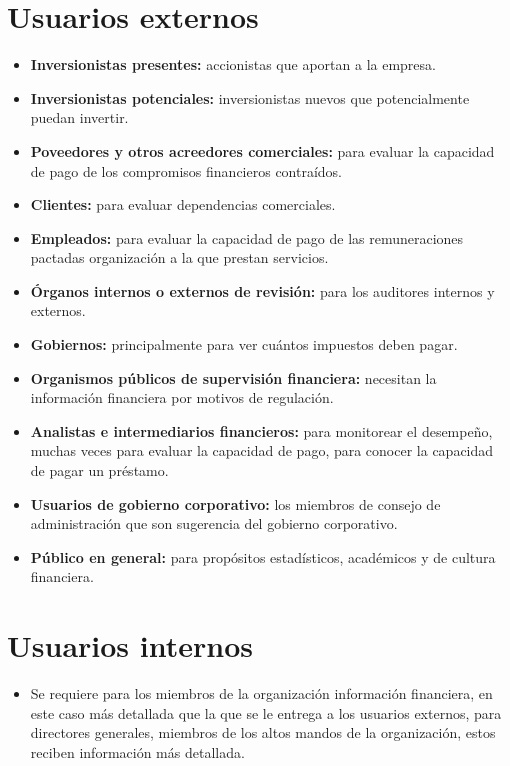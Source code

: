 \documentclass{article}
\begin{document}
\section{Usuarios externos}
\begin{itemize}
    \item \textbf{Inversionistas presentes:} accionistas que aportan a la empresa.
    \item \textbf{Inversionistas potenciales:} inversionistas nuevos que potencialmente puedan invertir.
    \item \textbf{Poveedores y otros acreedores comerciales:} para evaluar la capacidad de pago de los compromisos financieros contraídos.
    \item \textbf{Clientes:} para evaluar dependencias comerciales.
    \item \textbf{Empleados:} para evaluar la capacidad de pago de las remuneraciones pactadas organización a la que prestan servicios.
    \item \textbf{Órganos internos o externos de revisión:} para los auditores internos y externos.
    \item \textbf{Gobiernos:} principalmente para ver cuántos impuestos deben pagar.
    \item \textbf{Organismos públicos de supervisión financiera:} necesitan la información financiera por motivos de regulación.
    \item \textbf{Analistas e intermediarios financieros:} para monitorear el desempeño, muchas veces para evaluar la capacidad de pago, para conocer la capacidad de pagar un préstamo.
    \item \textbf{Usuarios de gobierno corporativo:} los miembros de consejo de administración que son sugerencia del gobierno corporativo.
    \item \textbf{Público en general:} para propósitos estadísticos, académicos y de cultura financiera.
\end{itemize}

\section{Usuarios internos}
\begin{itemize}
    \item Se requiere para los miembros de la organización información financiera, en este caso más detallada que la que se le entrega a los usuarios externos, para directores generales, miembros de los altos mandos de la organización, estos reciben información más detallada.
\end{itemize}
\end{document}
